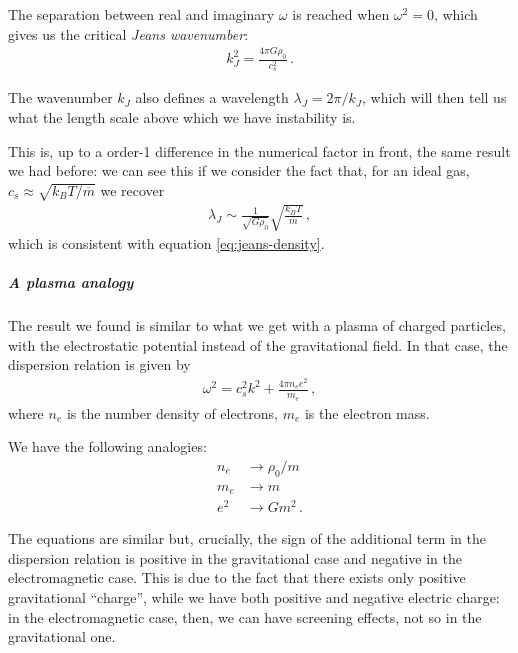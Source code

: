 \documentclass[main.tex]{subfiles}
\begin{document}
The separation between real and imaginary \(\omega \) is reached when \(\omega^2 = 0\), which gives us the critical \emph{Jeans wavenumber}:
%
\begin{align}
  k_J^2 = \frac{4 \pi G \rho_0 }{c_s^2}
\,.
\end{align}
%

The wavenumber \(k_J\) also defines a wavelength \(\lambda _J = 2 \pi / k_J\), which will then tell us what the length scale above which we have instability is.

This is, up to a order-1 difference in the numerical factor in front, the same result we had before: we can see this if we consider the fact that, for an ideal gas, \(c_s \approx \sqrt{k_B T / \overline{m}} \) we recover 
%
\begin{align}
\lambda _J \sim \frac{1}{\sqrt{G \rho_0 }} \sqrt{ \frac{k_BT}{\overline{m}}}
\,,
\end{align}
%
which is consistent with equation \eqref{eq:jeans-density}.

\subparagraph{A plasma analogy}

The result we found is similar to what we get with a plasma of charged particles, with the electrostatic potential instead of the gravitational field. 
In that case, the dispersion relation is given by
%
\begin{align}
  \omega^2 = c_s^2 k^2 + \frac{4 \pi n_e e^2}{m_e}
\,,
\end{align}
%
where \(n_e\) is the number density of electrons, \(m_e\) is the electron mass. 

We have the following analogies: 
%
\begin{subequations}
\begin{align}
  n_e &\rightarrow \rho_0 / m  \\
  m_e &\rightarrow m  \\
  e^2 &\rightarrow Gm^2 
\,.
\end{align}
\end{subequations}
%

The equations are similar but, crucially, the sign of the additional term in the dispersion relation is positive in the gravitational case and negative in the electromagnetic case. This is due to the fact that there exists only positive gravitational ``charge'', while we have both positive and negative electric charge: in the electromagnetic case, then, we can have screening effects, not so in the gravitational one.
\end{document}
